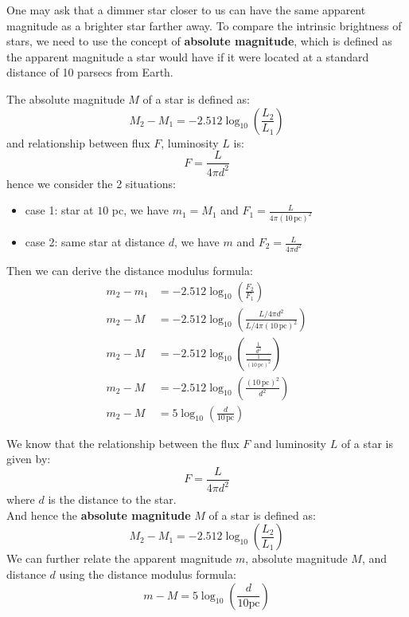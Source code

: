 \clearpage
\begin{intuition}
    One may ask that a dimmer star closer to us can have the same apparent magnitude as a brighter star farther away. To compare the intrinsic brightness of stars, we need to use the concept of \textbf{absolute magnitude}, which is defined as the apparent magnitude a star would have if it were located at a standard distance of 10 parsecs from Earth.
\end{intuition}

\bigskip\noindent
\begin{foundation}
    The absolute magnitude $M$ of a star is defined as:
    \[
        M_2 - M_1 = -2.512 \log_{10}\left(\frac{L_2}{L_1}\right)
    \]
    and relationship between flux $F$, luminosity $L$ is:
    \[
        F = \frac{L}{4\pi d^2}
    \]
    hence we consider the 2 situations:
    \begin{itemize}
        \item case 1: star at $10$ pc, we have $m_1 = M_1$ and $F_1 = \frac{L}{4\pi (10\,\text{pc})^2}$
        \item case 2: same star at distance $d$, we have $m$ and $F_2 = \frac{L}{4\pi d^2}$
    \end{itemize}
    Then we can derive the distance modulus formula:
    \begin{align*}
        m_2 - m_1 &= -2.512 \log_{10}\left(\frac{F_2}{F_1}\right) \\
        m_2 - M &= -2.512 \log_{10}\left(\frac{L / 4\pi d^2}{L / 4\pi (10\,\text{pc})^2}\right) \\
        m_2 - M &= -2.512 \log_{10}\left(\frac{\frac{1}{d^2}}{\frac{1}{(10\,\text{pc})^2}}\right) \\
        m_2 - M &= -2.512 \log_{10}\left(\frac{(10\,\text{pc})^2}{d^2}\right) \\
        m_2 - M &= 5 \log_{10}\left(\frac{d}{10\,\text{pc}}\right)
    \end{align*}
\end{foundation}

\bigskip\noindent
\begin{theory}
    We know that the relationship between the flux $F$ and luminosity $L$ of a star is given by:
    \begin{equation}
        F = \frac{L}{4\pi d^2}
    \end{equation}
    where $d$ is the distance to the star. \\

    And hence the \textbf{absolute magnitude} $M$ of a star is defined as:
    \begin{equation}
       M_2 - M_1 = -2.512 \log_{10}\left(\frac{L_2}{L_1}\right)
    \end{equation}
    We can further relate the apparent magnitude $m$, absolute magnitude $M$, and distance $d$ using the distance modulus formula:
    \begin{equation}
        m - M = 5 \log_{10}\left(\frac{d}{10 \text{pc}}\right)
    \end{equation}
\end{theory}

